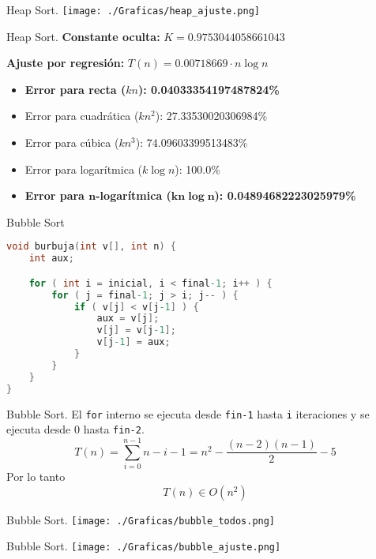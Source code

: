 \documentclass[10pt, xcolor=table]{beamer}
\begin{document}
\begin{frame}[fragile]{Heap Sort. 
}
\texttt{[image: ./Graficas/heap\_ajuste.png]}
\end{frame}

\begin{frame}[fragile]{Heap Sort. 
	}
\textbf{Constante oculta:} $K=0.9753044058661043$

\textbf{Ajuste por regresión:} $T(n)=0.00718669\cdot n \log n$
\begin{itemize}
	\item \textbf{Error para recta ($kn$): 0.04033354197487824\%}
	\item Error para cuadrática ($kn^2$): 27.33530020306984\%
	\item Error para cúbica ($kn^3$): 74.09603399513483\%
	\item Error para logarítmica ($k\log n$): 100.0\%
	\item \textbf{Error para $\boldsymbol{n}$-logarítmica ($\boldsymbol{kn\log n}$): 0.04894682223025979\%}
\end{itemize}
\end{frame}

\begin{frame}[fragile]{Bubble Sort}
\begin{lstlisting}[language=C]
void burbuja(int v[], int n) {
	int aux;

	for ( int i = inicial, i < final-1; i++ ) {
		for ( j = final-1; j > i; j-- ) {
			if ( v[j] < v[j-1] ) {
				aux = v[j];
				v[j] = v[j-1];
				v[j-1] = aux;
			}
		}
	}
}
\end{lstlisting}
\end{frame}

\begin{frame}[fragile]{Bubble Sort. 
}
El \texttt{for} interno se ejecuta desde \texttt{fin-1} hasta \texttt{i} iteraciones y se ejecuta desde 0 hasta \texttt{fin-2}. $$T(n)=\sum_{i=0}^{n-1}{n-i-1}=n^2-\frac{(n-2)(n-1)}{2}-5$$
Por lo tanto $$T(n) \in O(n^2)$$


\end{frame}

\begin{frame}[fragile]{Bubble Sort. 
}
\texttt{[image: ./Graficas/bubble\_todos.png]}
\end{frame}

\begin{frame}[fragile]{Bubble Sort. 
}
\texttt{[image: ./Graficas/bubble\_ajuste.png]}
\end{frame}
\end{document}

